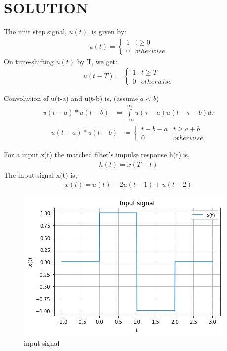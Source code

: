 \documentclass[journal,12pt,twocolumn]{IEEEtran}
\begin{document}
\section{SOLUTION}
\begin{lemma}
    The unit step signal, $u(t)$, is given by:
\begin{align}
    u(t) = 
    \begin{cases}
    1 & t\geq0\\
    0 & otherwise
    \end{cases}
    \label{u(t)}
\end{align}
On time-shifting $u(t)$ by T, we get:
\begin{align}
     u(t - T) =
    \begin{cases}
    1 & t\geq T\\
    0 & otherwise
    \end{cases}
    \label{u(t-T)}
\end{align}
\end{lemma}
\begin{lemma}
Convolution of u(t-a) and u(t-b) is, (assume $a<b$)
\begin{align}
   \nonumber u(t-a)*u(t-b)&=\int\limits_{-\infty}^{\infty}u(\tau-a)u(t-\tau-b) d\tau
\end{align}
\begin{align}
   \nonumber u(t-a)*u(t-b)&= \begin{cases}
    t-b-a & t\geq a+b\\
    0 & otherwise
    \end{cases}
\end{align}
\label{convolve}
\end{lemma}
For a input x(t) the matched filter's impulse response h(t) is,
\begin{align}
    h(t) = x(T-t) \label{0}
\end{align}
The input signal x(t) is,
\begin{align}
    x(t) = u(t)-2u(t-1)+u(t-2)
\end{align}
 \begin{figure}[!htp]
\centering
 \includegraphics[width=\columnwidth]{input.png}
 \caption{input signal}
 \end{figure}
 
\end{document}
